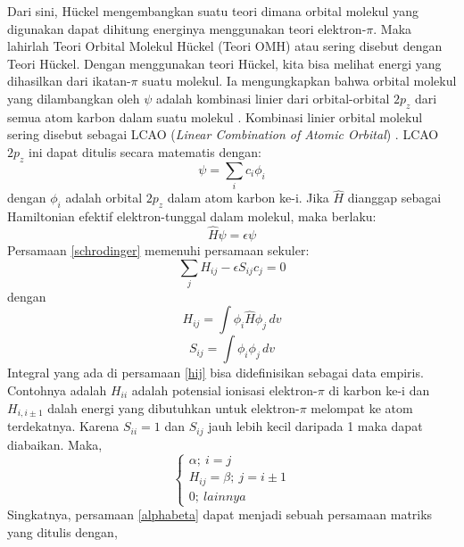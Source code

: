 \documentclass[12pt,a4paper]{report}
\begin{document}
	Dari sini, Hückel mengembangkan suatu teori dimana orbital molekul yang digunakan dapat dihitung energinya menggunakan teori elektron-{$\pi$}. Maka lahirlah Teori Orbital Molekul Hückel (Teori OMH) atau sering disebut dengan Teori Hückel. Dengan menggunakan teori Hückel, kita bisa melihat energi yang dihasilkan dari ikatan-{$\pi$} suatu molekul. Ia mengungkapkan bahwa orbital molekul yang dilambangkan oleh
	{$\psi$} adalah kombinasi linier dari orbital-orbital {$2p_z$} dari semua atom karbon dalam suatu molekul \cite{Rustaman2008}. Kombinasi linier orbital molekul sering disebut sebagai LCAO (\textit{Linear Combination of Atomic Orbital}) \cite{Maczynski1991}. LCAO {$2p_z$} ini dapat ditulis secara matematis dengan:
	\begin{equation}
	\label{lcao}
	{\psi} = \sum\limits_{i} c_i{\phi}_i
	\end{equation}
	dengan {$\phi_i$} adalah orbital {$2p_z$} dalam atom karbon ke-i. Jika $\hat{H}$ dianggap sebagai Hamiltonian efektif elektron-tunggal dalam molekul, maka berlaku:
	\begin{equation}
	\label{schrodinger}
	\hat{H}\psi = \epsilon\psi
	\end{equation}
	Persamaan \eqref{schrodinger} memenuhi persamaan sekuler:
	\begin{equation}
	\sum\limits_{j} {H_{ij}}-{\epsilon}{S_{ij}}c_j=0
	\end{equation}
	dengan
	\begin{equation}
	\label{hij}
	H_{ij} = \int {\phi_i}{\hat{H}}{\phi_j} \,dv
	\end{equation}
	\begin{equation}
	S_{ij} = \int {\phi_i}{\phi_j} \,dv
	\end{equation}
	Integral yang ada di persamaan \eqref{hij} bisa didefinisikan sebagai data empiris. Contohnya adalah {$H_{ii}$} adalah potensial ionisasi elektron-{$\pi$} di karbon ke-i dan {$H_{i,i{\pm}1}$} dalah energi yang dibutuhkan untuk elektron-{$\pi$} melompat ke atom terdekatnya. Karena {$S_{ii}=1$} dan {$S_{ij}$} jauh lebih kecil daripada 1 maka dapat diabaikan. Maka,
	\begin{equation}
	\label{alphabeta}
	\begin{cases}
	\alpha ; \  i = j
	\\
	H_{ij} = \beta ; \ j = i{\pm}1
	\\
	0 ; \ lainnya
	\end{cases}
	\end{equation}
	Singkatnya, persamaan \eqref{alphabeta} dapat menjadi sebuah persamaan matriks yang ditulis dengan,
\end{document}
